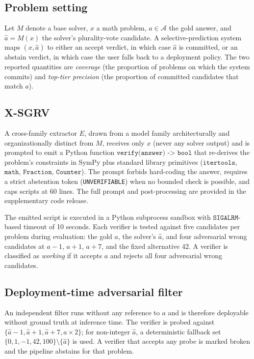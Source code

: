 \documentclass{article}
\begin{document}
\subsection{Problem setting}

Let $M$ denote a base solver, $x$ a math problem, $a\in\mathcal{A}$ the gold answer, and $\hat a = M(x)$ the solver's plurality-vote candidate. A selective-prediction system maps $(x, \hat a)$ to either an accept verdict, in which case $\hat a$ is committed, or an abstain verdict, in which case the user falls back to a deployment policy. The two reported quantities are \emph{coverage} (the proportion of problems on which the system commits) and \emph{top-tier precision} (the proportion of committed candidates that match $a$).

\subsection{X-SGRV}

A cross-family extractor $E$, drawn from a model family architecturally and organizationally distinct from $M$, receives only $x$ (never any solver output) and is prompted to emit a Python function $\texttt{verify(answer) -> bool}$ that re-derives the problem's constraints in SymPy plus standard library primitives ($\texttt{itertools}$, $\texttt{math}$, $\texttt{Fraction}$, $\texttt{Counter}$). The prompt forbids hard-coding the answer, requires a strict abstention token (\texttt{UNVERIFIABLE}) when no bounded check is possible, and caps scripts at 60 lines. The full prompt and post-processing are provided in the supplementary code release.

The emitted script is executed in a Python subprocess sandbox with $\texttt{SIGALRM}$-based timeout of 10 seconds. Each verifier is tested against five candidates per problem during evaluation: the gold $a$, the solver's $\hat a$, and four adversarial wrong candidates at $a-1$, $a+1$, $a+7$, and the fixed alternative $42$. A verifier is classified as \emph{working} if it accepts $a$ and rejects all four adversarial wrong candidates.

\subsection{Deployment-time adversarial filter}

An independent filter runs without any reference to $a$ and is therefore deployable without ground truth at inference time. The verifier is probed against $\{\hat a - 1, \hat a + 1, \hat a + 7, \hat a \times 2\}$; for non-integer $\hat a$, a deterministic fallback set $\{0,1,-1,42,100\}\setminus\{\hat a\}$ is used. A verifier that accepts any probe is marked broken and the pipeline abstains for that problem.
\end{document}
